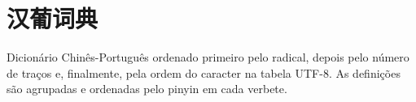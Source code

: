 \documentclass[a4paper,9pt,twoside,openright,book]{memoir}
\begin{document}
\let\clearforchapter\par %



\clearpage
\pagestyle{empty}
\tableofcontents

\clearpage
\pagestyle{empty}
\chapter{汉葡词典}

%
%

Dicionário Chinês-Português ordenado primeiro pelo radical,
depois pelo número de traços e, finalmente, pela ordem do
caracter na tabela UTF-8.  As definições são agrupadas e
ordenadas pelo pinyin em cada verbete.
\end{document}
